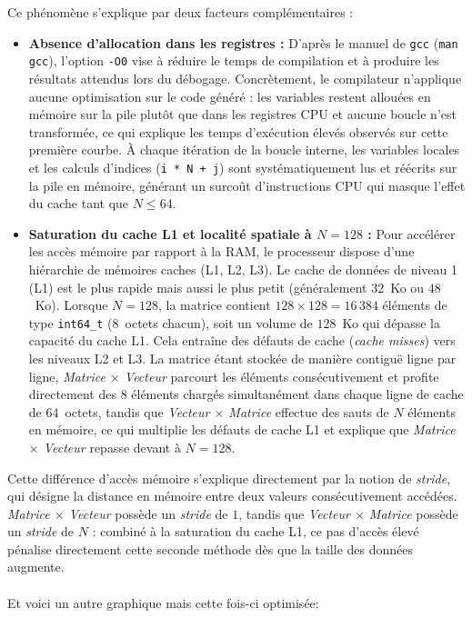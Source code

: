 \documentclass[14pt]{article}
\begin{document}
Ce phénomène s'explique par deux facteurs complémentaires :
\begin{itemize}
    \item \textbf{Absence d'allocation dans les registres :} D'après le manuel de \texttt{gcc} (\texttt{man gcc}), l'option \texttt{-O0} vise à réduire le temps de compilation et à produire les résultats attendus lors du débogage. Concrètement, le compilateur n'applique aucune optimisation sur le code généré : les variables restent allouées en mémoire sur la pile plutôt que dans les registres CPU et aucune boucle n'est transformée, ce qui explique les temps d'exécution élevés observés sur cette première courbe. À chaque itération de la boucle interne, les variables locales et les calculs d'indices (\texttt{i * N + j}) sont systématiquement lus et réécrits sur la pile en mémoire, générant un surcoût d'instructions CPU qui masque l'effet du cache tant que $N \le 64$.

    \item \textbf{Saturation du cache L1 et localité spatiale à $N = 128$ :} Pour accélérer les accès mémoire par rapport à la RAM, le processeur dispose d'une hiérarchie de mémoires caches (L1, L2, L3). Le cache de données de niveau 1 (L1) est le plus rapide mais aussi le plus petit (généralement $32$~Ko ou $48$~Ko). Lorsque $N = 128$, la matrice contient $128 \times 128 = 16\,384$ éléments de type \texttt{int64\_t} ($8$~octets chacun), soit un volume de $128$~Ko qui dépasse la capacité du cache L1. Cela entraîne des défauts de cache (\textit{cache misses}) vers les niveaux L2 et L3. La matrice étant stockée de manière contiguë ligne par ligne, \textit{Matrice $\times$ Vecteur} parcourt les éléments consécutivement et profite directement des $8$ éléments chargés simultanément dans chaque ligne de cache de $64$~octets, tandis que \textit{Vecteur $\times$ Matrice} effectue des sauts de $N$ éléments en mémoire, ce qui multiplie les défauts de cache L1 et explique que \textit{Matrice $\times$ Vecteur} repasse devant à $N = 128$.
\end{itemize}

Cette différence d'accès mémoire s'explique directement par la notion de \textit{stride}, qui désigne la distance en mémoire entre deux valeurs consécutivement accédées. \textit{Matrice $\times$ Vecteur} possède un \textit{stride} de $1$, tandis que \textit{Vecteur $\times$ Matrice} possède un \textit{stride} de $N$ : combiné à la saturation du cache L1, ce pas d'accès élevé pénalise directement cette seconde méthode dès que la taille des données augmente.
\\\\
Et voici un autre graphique mais cette fois-ci optimisée:
\end{document}

